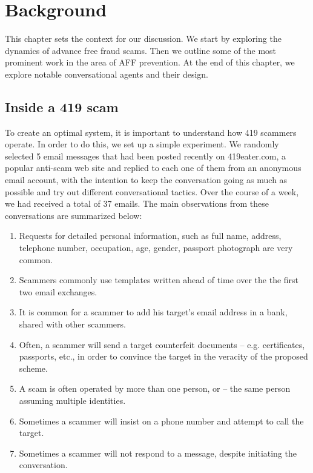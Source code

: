 \chapter{Background}
This chapter sets the context for our discussion. We start by exploring the dynamics of advance free fraud scams. Then we outline some of the most prominent work in the area of AFF prevention. At the end of this chapter, we explore notable conversational agents and their design.

\section{Inside a 419 scam}
To create an optimal system, it is important to understand how 419 scammers operate. In order to do this, we set up a simple experiment. We randomly selected 5 email messages that had been posted recently on 419eater.com, a popular anti-scam web site and replied to each one of them from an anonymous email account, with the intention to keep the conversation going as much as possible and try out different conversational tactics. Over the course of a week, we had received a total of 37 emails. The main observations from these conversations are summarized below:
\begin{enumerate}
\item Requests for detailed personal information, such as full name, address, telephone number, occupation, age, gender, passport photograph are very common.
\vspace{-5mm}
\item Scammers commonly use templates written ahead of time over the the first two email exchanges.
\vspace{-5mm}
\item It is common for a scammer to add his target's email address in a bank, shared with other scammers.
\vspace{-5mm}
\item Often, a scammer will send a target counterfeit documents – e.g. certificates, passports, etc., in order to convince the target in the veracity of the proposed scheme.
\vspace{-5mm}
\item A scam is often operated by more than one person, or – the same person assuming multiple identities. 
\vspace{-5mm}
\item Sometimes a scammer will insist on a phone number and attempt to call the target.
\vspace{-5mm}
\item Sometimes a scammer will not respond to a message, despite initiating the conversation.
\end{enumerate}

